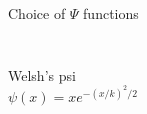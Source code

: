 \documentclass[10pt,xcolor=svgnames]{beamer} %
\begin{document}
\begin{frame}{Choice of $\Psi$ functions}
\begin{columns}
{\begin{itemize}
{\begin{equation*}
            \end{equation*}
        }
         {\item Welsh's psi
            \begin{equation*}
                \psi(x) = x e^{-(x/k)^2/2}
            \end{equation*}
        }
    \end{itemize}}
\end{columns}
\end{frame}
\end{document}
